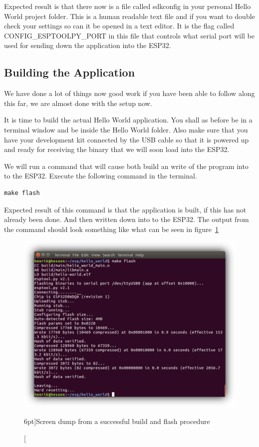 \documentclass{tufte-book}
\begin{document}
Expected result is that there now is a file called sdkconfig in your personal Hello World project folder. This is a human readable text file and if you want to double check your settings so can it be opened in a text editor. It is the flag called CONFIG\_ESPTOOLPY\_PORT in this file that controls what serial port will be used for sending down the application into the ESP32.

\subsection{Building the Application}
We have done a lot of things now good work if you have been able to follow along this far, we are almost done with the setup now.

It is time to build the actual Hello World application. You shall as before be in a terminal window and be inside the Hello World folder. Also make sure that you have your development kit connected by the USB cable so that it is powered up and ready for receiving the binary that we will soon load into the ESP32.


We will run a command that will cause both build an write of the program into to the ESP32. Execute the following command in the terminal.

\begin{lstlisting}
make flash
\end{lstlisting}

Expected result of this command is that the application is built, if this has not already been done. And then written down into to the ESP32.
The output from the command should look something like what can be seen in figure~\ref{fig:hello_world_make_flash_shadowed}

\begin{figure}
	\includegraphics{hello_world_make_flash_shadowed.png}
	\caption[ $n$. ][6pt]{Screen dump from a successful build and flash procedure}
	\label{fig:hello_world_make_flash_shadowed}
\end{figure}
\end{document}
